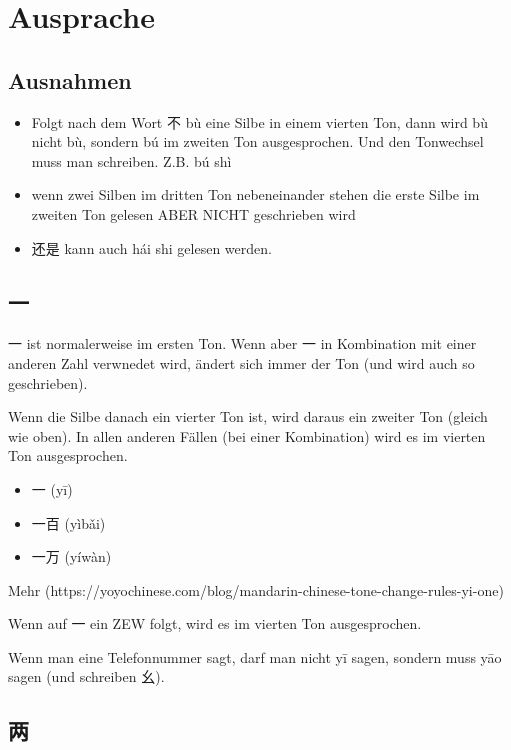 \documentclass[UTF8]{ctexart}
\begin{document}
\section{Ausprache}

\subsection{Ausnahmen}

\begin{itemize}
    \item Folgt nach dem Wort 不 bù eine Silbe in einem vierten Ton, dann wird bù nicht bù,
    sondern bú im zweiten Ton ausgesprochen. Und den Tonwechsel muss man
    schreiben. Z.B. bú shì
    \item wenn zwei Silben im dritten Ton nebeneinander stehen die erste Silbe im zweiten
    Ton gelesen ABER NICHT geschrieben wird
    \item 还是 kann auch hái shi gelesen werden.
\end{itemize}

\subsection{一}

一 ist normalerweise im ersten Ton. Wenn aber 一 in Kombination mit einer anderen Zahl verwnedet wird, ändert sich immer der Ton (und wird auch so geschrieben). 

Wenn die Silbe danach ein vierter Ton ist, wird daraus ein zweiter Ton (gleich wie oben). In allen anderen Fällen (bei einer Kombination) wird es im vierten Ton ausgesprochen.

\begin{itemize}
    \item 一 (yī)
    \item 一百 (yìbǎi)
    \item 一万 (yíwàn)
\end{itemize}

Mehr (https://yoyochinese.com/blog/mandarin-chinese-tone-change-rules-yi-one)

Wenn auf 一 ein ZEW folgt, wird es im vierten Ton ausgesprochen.

Wenn man eine Telefonnummer sagt, darf man nicht yī sagen, sondern muss yāo sagen (und schreiben 幺).

\subsection{两}
\end{document}

